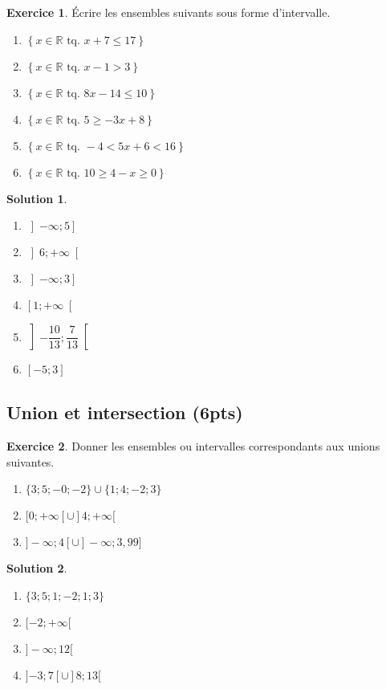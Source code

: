 \documentclass[a4paper, 14pt]{extarticle}
\theoremstyle{plain}
\newtheorem*{sol}{Solution}
\theoremstyle{definition}
\newtheorem{ex}{Exercice}
\newcommand{\R}{\mathbb{R}}
\newcommand{\xRtq}[1]{
	$\left\{ x \in \R \text{ tq. } #1 \right\}$
}
\newcommand{\pinfty}{{+}\infty}
\newcommand{\minfty}{{-}\infty}
\newcommand{\exe}[2]{
		\begin{ex} #1  \end{ex}
		\begin{sol} #2 \end{sol}
	}
\newcommand{\exe}[2]{
		\begin{ex} #1  \end{ex}
	}
\begin{document}
\exe{
	Écrire les ensembles suivants sous forme d'intervalle.
	
	\begin{multicols}{2}
	\begin{enumerate}
		\item \xRtq{x + 7 \leq 17}
		\item \xRtq{x  - 1 > 3}
		\item \xRtq{8x  - 14 \leq 10}
		\item \xRtq{5 \geq -3x + 8}
		\item \xRtq{-4 < 5x + 6 < 16}
		\item \xRtq{10 \geq 4 - x \geq 0}
	\end{enumerate}
	\end{multicols}
}
{


	\begin{multicols}{2}
	\begin{enumerate}
		\item $\left]-\infty ; 5\right]$
		\item $\left]6 ; +\infty\right[$
		\item $\left]-\infty; 3 \right]$
		\item $\left[1 ; +\infty \right[$
		\item $\left] -\dfrac{10}{13} ; \dfrac{7}{13} \right[$
		\item $\left[ -5 ; 3 \right]$\
	\end{enumerate}
	\end{multicols}
}

\subsection*{Union et intersection (6pts)}

\exe{
	Donner les ensembles ou intervalles correspondants aux unions suivantes.
	\begin{multicols}{2}
	\begin{enumerate}
		\item $\{ 3 ; 5 ; -0 ; -2 \} \cup \{  1; 4 ; -2 ; 3\}$
		\item $[0 ; \pinfty[ \cup ]4 ; \pinfty[$
		\item $ ]\minfty ; 4[ \cup ]\minfty ; 3{,}99]$
	\end{enumerate}
	\end{multicols}
}
{

	\begin{multicols}{2}
	\begin{enumerate}
		\item $\{3;5;1;-2;1;3\}$
		\item $[{-}2 ; \pinfty[$
		\item $ ]\minfty ; 12[$
		\item $]{-3};7[ \cup ]8; 13[$
	\end{enumerate}
	\end{multicols}

}
\end{document}
